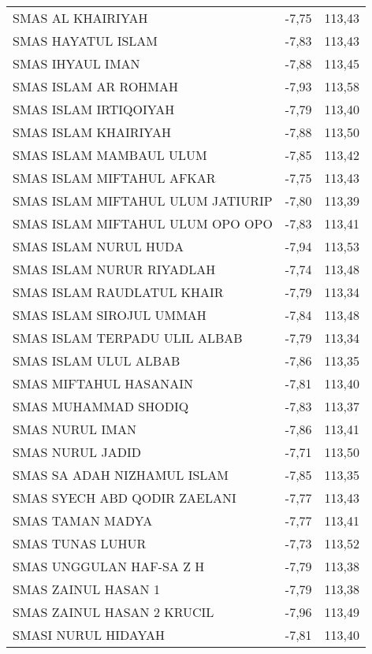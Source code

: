 {\begin{longtable}[c]{lcc}
SMAS   AL KHAIRIYAH                 & -7,75 & 113,43 \\
\rowcolor[HTML]{D9E1F2} 
SMAS HAYATUL ISLAM                  & -7,83 & 113,43 \\
SMAS   IHYAUL IMAN                  & -7,88 & 113,45 \\
\rowcolor[HTML]{D9E1F2} 
SMAS ISLAM AR ROHMAH                & -7,93 & 113,58 \\
SMAS   ISLAM IRTIQOIYAH             & -7,79 & 113,40 \\
\rowcolor[HTML]{D9E1F2} 
SMAS ISLAM KHAIRIYAH                & -7,88 & 113,50 \\
SMAS   ISLAM MAMBAUL ULUM           & -7,85 & 113,42 \\
\rowcolor[HTML]{D9E1F2} 
SMAS ISLAM MIFTAHUL AFKAR           & -7,75 & 113,43 \\
SMAS   ISLAM MIFTAHUL ULUM JATIURIP & -7,80 & 113,39 \\
\rowcolor[HTML]{D9E1F2} 
SMAS ISLAM MIFTAHUL ULUM OPO OPO    & -7,83 & 113,41 \\
SMAS   ISLAM NURUL HUDA             & -7,94 & 113,53 \\
\rowcolor[HTML]{D9E1F2} 
SMAS ISLAM NURUR RIYADLAH           & -7,74 & 113,48 \\
SMAS   ISLAM RAUDLATUL KHAIR        & -7,79 & 113,34 \\
\rowcolor[HTML]{D9E1F2} 
SMAS ISLAM SIROJUL UMMAH            & -7,84 & 113,48 \\
SMAS   ISLAM TERPADU ULIL ALBAB     & -7,79 & 113,34 \\
\rowcolor[HTML]{D9E1F2} 
SMAS ISLAM ULUL ALBAB               & -7,86 & 113,35 \\
SMAS   MIFTAHUL HASANAIN            & -7,81 & 113,40 \\
\rowcolor[HTML]{D9E1F2} 
SMAS MUHAMMAD SHODIQ                & -7,83 & 113,37 \\
SMAS   NURUL IMAN                   & -7,86 & 113,41 \\
\rowcolor[HTML]{D9E1F2} 
SMAS NURUL JADID                    & -7,71 & 113,50 \\
SMAS   SA ADAH NIZHAMUL ISLAM       & -7,85 & 113,35 \\
\rowcolor[HTML]{D9E1F2} 
SMAS SYECH ABD QODIR ZAELANI        & -7,77 & 113,43 \\
SMAS   TAMAN MADYA                  & -7,77 & 113,41 \\
\rowcolor[HTML]{D9E1F2} 
SMAS TUNAS LUHUR                    & -7,73 & 113,52 \\
SMAS   UNGGULAN HAF-SA Z H          & -7,79 & 113,38 \\
\rowcolor[HTML]{D9E1F2} 
SMAS ZAINUL HASAN 1                 & -7,79 & 113,38 \\
SMAS   ZAINUL HASAN 2 KRUCIL        & -7,96 & 113,49 \\
\rowcolor[HTML]{D9E1F2} 
SMASI NURUL HIDAYAH                 & -7,81 & 113,40
\end{longtable}
}